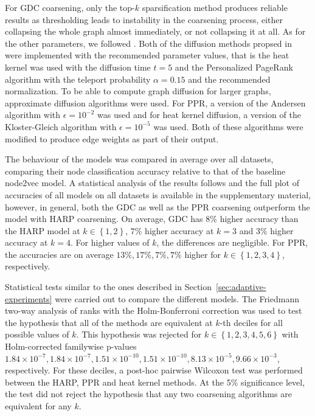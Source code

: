 For GDC coarsening, only the top-\( k \) sparsification method produces reliable results as thresholding leads to instability in the coarsening process, either collapsing the whole graph almost immediately, or not collapsing it at all. As for the other parameters, we followed \cite{gasteiger_diffusion_2019}. Both of the diffusion methods propsed in \cite{gasteiger_diffusion_2019} were implemented with the recommended parameter values, that is the heat kernel was used with the diffusion time \( t = 5 \) and the Personalized PageRank algorithm with the teleport probability \( \alpha = 0.15 \) and the recommended normalization. To be able to compute graph diffusion for larger graphs, approximate diffusion algorithms were used. For PPR, a version of the Andersen algorithm \cite{andersen_local_2006} with \( \epsilon = 10^{-2} \) was used and for heat kernel diffusion, a version of the Kloster-Gleich algorithm \cite{kloster_heat_2014} with \( \epsilon = 10^{-5} \) was used. Both of these algorithms were modified to produce edge weights as part of their output.

The behaviour of the models was compared in average over all datasets, comparing their node classification accuracy relative to that of the baseline node2vec model. A statistical analysis of the results follows and the full plot of accuracies of all models on all datasets is available in the supplementary material, however, in general, both the GDC as well as the PPR coarsening outperform the model with  HARP coarsening. On average, GDC has \( 8\% \) higher accuracy than the HARP model at \( k \in \left\{ 1, 2 \right\} \), \( 7\% \) higher accuracy at \( k = 3 \) and \( 3\% \) higher accuracy at \( k = 4 \). For higher values of \( k \), the differences are negligible. For PPR, the accuracies are on average \( 13\%, 17\%, 7\%, 7\% \) higher for \( k \in \left\{ 1, 2, 3, 4 \right\} \), respectively.

Statistical tests similar to the ones described in Section~\ref{sec:adaptive-experiments} were carried out to compare the different models. The Friedmann two-way analysis of ranks with the Holm-Bonferroni correction was used to test the hypothesis that all of the methods are equivalent at \( k \)-th deciles for all possible values of \( k \). This hypothesis was rejected for \( k \in \left\{ 1, 2, 3, 4, 5, 6 \right\} \) with Holm-corrected familywise p-values \( 1.84 \times 10^{-7}, 1.84 \times 10^{-7}, 1.51 \times 10^{-10}, 1.51 \times 10^{-10}, 8.13 \times 10^{-5}, 9.66 \times 10^{-3} \), respectively. For these deciles, a post-hoc pairwise Wilcoxon test was performed between the HARP, PPR and heat kernel methods. At the 5\% significance level, the test did not reject the hypothesis that any two coarsening algorithms are equivalent for any \( k \).

